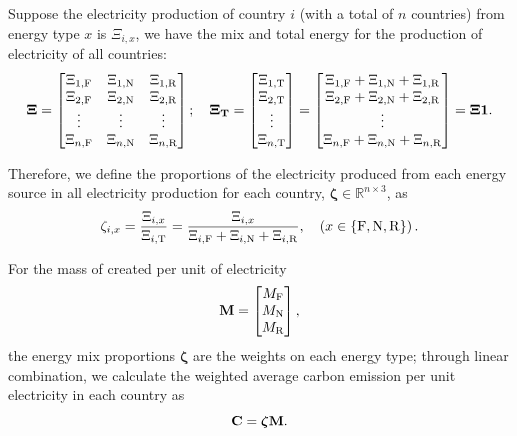 \documentclass[12pt]{article}
\begin{document}
Suppose the electricity production of country $i$ (with a total of $n$ countries) from energy type $x$ is $\Xi_{i,x}$, we have the mix and total energy for the production of electricity of all countries:
\begin{equation}
	\vb{\Xi} = \begin{bmatrix}
		\Xi_{1,\rm F} & \Xi_{1,\rm N} & \Xi_{1,\rm R} \\
		\Xi_{2,\rm F} & \Xi_{2,\rm N} & \Xi_{2,\rm R} \\
		\vdots & \vdots & \vdots \\
		\Xi_{n,\rm F} & \Xi_{n,\rm N} & \Xi_{n,\rm R} \\
	\end{bmatrix}; \quad
	\vb{\Xi_T}
	= \begin{bmatrix}
		\Xi_{1,\rm T} \\
		\Xi_{2,\rm T} \\
		\vdots \\
		\Xi_{n,\rm T} \\
	\end{bmatrix}
	= \begin{bmatrix}
		\Xi_{1,\rm F} + \Xi_{1,\rm N} + \Xi_{1,\rm R} \\
		\Xi_{2,\rm F} + \Xi_{2,\rm N} + \Xi_{2,\rm R} \\
		\vdots \\
		\Xi_{n,\rm F} + \Xi_{n,\rm N} + \Xi_{n,\rm R} \\
	\end{bmatrix}
	= \vb{\Xi} \vb{1}.
\end{equation}

Therefore, we define the proportions of the electricity produced from each energy source in all electricity production for each country, $\boldsymbol{\zeta} \in \mathbb{R}^{n \times 3}$, as
\begin{equation}
	\zeta_{i, x}
	= \frac{\Xi_{i, x}}{\Xi_{i,\rm T}}
	= \frac{\Xi_{i, x}}{\Xi_{i,\rm F} + \Xi_{i,\rm N} + \Xi_{i,\rm R}}, \quad
	\left(
		x \in \left\{ \rm F, N, R \right\}
	\right).
\end{equation}

For the mass of  created per unit of electricity
\begin{equation}
	\vb{M} = \begin{bmatrix}
		M_{\rm F} \\
		M_{\rm N} \\
		M_{\rm R} \\
	\end{bmatrix},
\end{equation}
the energy mix proportions $\boldsymbol{\zeta}$ are the weights on each energy type; through linear combination, we calculate the weighted average carbon emission per unit electricity in each country as
\begin{equation}
	\vb{C} = \boldsymbol{\zeta} \vb{M}.
\end{equation}
\end{document}
